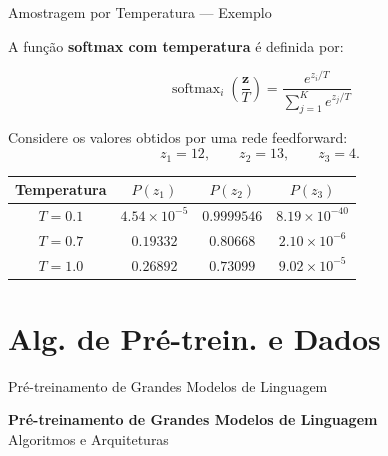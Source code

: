 \documentclass[aspectratio=169]{beamer}
\begin{document}
\begin{frame}{Amostragem por Temperatura — Exemplo}
    \justifying

    \vspace{0.2cm}

    A função \textbf{softmax com temperatura} é definida por:

    \[
        \operatorname{softmax}_i\left(\frac{\mathbf{z}}{T}\right)
        =
        \frac{e^{z_i/T}}
        {\displaystyle\sum_{j=1}^{K} e^{z_j/T}}
    \]

    \vspace{0.15cm}

    Considere os valores obtidos por uma rede feedforward:
    \[
        z_1=12,\qquad z_2=13,\qquad z_3=4.
    \]

    \vspace{0.1cm}

    \begin{center}
    \renewcommand{\arraystretch}{1.3}
    \begin{tabular}{c|ccc}
        \hline
        \textbf{Temperatura} & $P(z_1)$ & $P(z_2)$ & $P(z_3)$ \\
        \hline
        $T=0.1$ &
        $4.54\times10^{-5}$ &
        $0.9999546$ &
        $8.19\times10^{-40}$ \\

        $T=0.7$ &
        $0.19332$ &
        $0.80668$ &
        $2.10\times10^{-6}$ \\

        $T=1.0$ &
        $0.26892$ &
        $0.73099$ &
        $9.02\times10^{-5}$ \\
        \hline
    \end{tabular}
    \end{center}
\end{frame}

\section{Alg. de Pré-trein. e Dados}

\begin{frame}{Pré-treinamento de Grandes Modelos de Linguagem}
    \begin{center}
        \huge \textbf{Pré-treinamento de Grandes Modelos de Linguagem}\\
        \vspace{0.5cm}
        \Large Algoritmos e Arquiteturas
    \end{center}
\end{frame}
\end{document}

